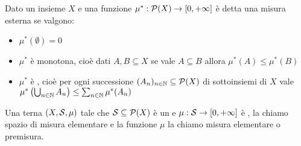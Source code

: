 \begin{definition}
	Dato un insieme $X$ e una funzione $\mu^*:\mathcal P(X)\to \Rpiu$ è detta una misura esterna se valgono:
	\begin{itemize}
		\item $\mu^*(\emptyset)=0$
		\item $\mu^*$ è monotona, cioè dati $A,B\subseteq X$ se vale $A\subseteq B$ allora $\mu^*(A)\le \mu^*(B)$
		\item $\mu^*$ è \sigsubadd{}, cioè  per ogni successione $(A_n)_{n\in\N}\subseteq \mathcal P(X)$ di sottoinsiemi di $X$ vale $\mu^*\left(\bigcup_{n\in\mathbb{N}}A_n\right)\le \sum_{n\in\N} \mu^*(A_n)$
	\end{itemize}
\end{definition}

\begin{definition}
	Una terna $(X,\S,\mu)$ tale che $\S\subseteq\mathcal P(X)$ è un \semiring{} e $\mu:\S\to \Rpiu$ è \sigadd{}, la chiamo spazio di misura elementare e la funzione $\mu$ la chiamo misura elementare o premisura.
\end{definition}

